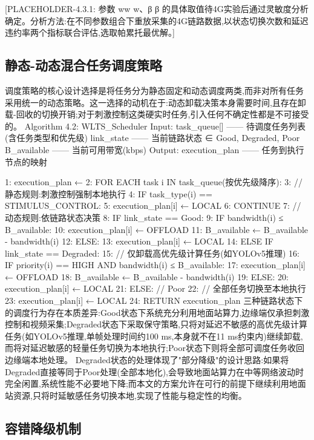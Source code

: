 [PLACEHOLDER-4.3.1: 参数 ww
w、β\beta
β 的具体取值待4G实验后通过灵敏度分析确定。分析方法:在不同参数组合下重放采集的4G链路数据,以状态切换次数和延迟违约率两个指标联合评估,选取帕累托最优解。]



\subsection{静态-动态混合任务调度策略}

调度策略的核心设计选择是将任务分为静态固定和动态调度两类,而非对所有任务采用统一的动态策略。这一选择的动机在于:动态卸载决策本身需要时间,且存在卸载-回收的切换开销;对于刺激控制这类硬实时任务,引入任何不确定性都是不可接受的。
Algorithm 4.2: WLTS_Scheduler
Input:  task_queue[]  —— 待调度任务列表(含任务类型和优先级)
        link_state    —— 当前链路状态 ∈ {Good, Degraded, Poor}
        B_available   —— 当前可用带宽(kbps)
Output: execution_plan —— 任务到执行节点的映射

1:  execution_plan ← {}
2:  FOR EACH task i IN task_queue(按优先级降序):
3:      // 静态规则:刺激控制强制本地执行
4:      IF task_type(i) == STIMULUS_CONTROL:
5:          execution_plan[i] ← LOCAL
6:          CONTINUE
7:      // 动态规则:依链路状态决策
8:      IF link_state == Good:
9:          IF bandwidth(i) ≤ B_available:
10:             execution_plan[i] ← OFFLOAD
11:             B_available ← B_available - bandwidth(i)
12:         ELSE:
13:             execution_plan[i] ← LOCAL
14:     ELSE IF link_state == Degraded:
15:         // 仅卸载高优先级计算任务(如YOLOv5推理)
16:         IF priority(i) == HIGH AND bandwidth(i) ≤ B_available:
17:             execution_plan[i] ← OFFLOAD
18:             B_available ← B_available - bandwidth(i)
19:         ELSE:
20:             execution_plan[i] ← LOCAL
21:     ELSE:  // Poor
22:         // 全部任务切换至本地执行
23:         execution_plan[i] ← LOCAL
24: RETURN execution_plan
三种链路状态下的调度行为存在本质差异:Good状态下系统充分利用地面站算力,边缘端仅承担刺激控制和视频采集;Degraded状态下采取保守策略,只将对延迟不敏感的高优先级计算任务(如YOLOv5推理,单帧处理时间约100 ms,本身就不在11 ms约束内)继续卸载,而将对延迟敏感的轻量任务切换为本地执行;Poor状态下则将全部可调度任务收回边缘端本地处理。
Degraded状态的处理体现了"部分降级"的设计思路:如果将Degraded直接等同于Poor处理(全部本地化),会导致地面站算力在中等网络波动时完全闲置,系统性能不必要地下降;而本文的方案允许在可行的前提下继续利用地面站资源,只将时延敏感任务切换本地,实现了性能与稳定性的均衡。
\subsection{容错降级机制}

